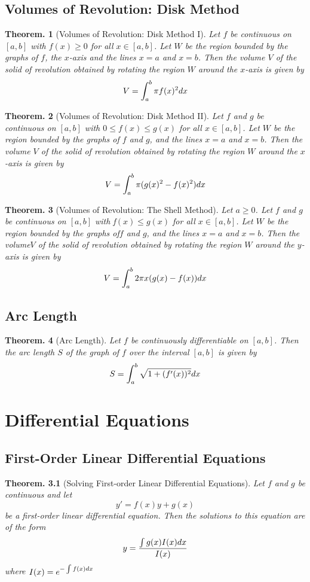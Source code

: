 \documentclass[11pt, a4paper]{memoir}
\theoremstyle{change}
\newtheorem{theorem}{Theorem.}[section]
\theoremstyle{plain}
\theoremstyle{nonumberplain}
\numberwithin{equation}{section}
\begin{document}
\section{Volumes of Revolution: Disk Method}
\begin{theorem}[Volumes of Revolution: Disk Method I]
    Let $f$ be continuous on $[a,b]$ with $f(x) \ge 0$  for all $x \in [a,b]$. Let $W$ be the region bounded by the graphs of $f$, the $x$-axis and the lines $x = a$ and $x = b$. Then the volume $V$ of the solid of revolution obtained by rotating the region $W$ around the $x$-axis is given by $$V = \int^b_a \pi f(x)^2 \space dx$$
\end{theorem}
\begin{theorem}[Volumes of Revolution: Disk Method II]
    Let $f$ and $g$ be continuous on $[a,b]$ with $0 \le f(x) \le g(x)$ for all $x \in [a,b]$. Let $W$ be the region bounded by the graphs of $f$ and $g$, and the lines $x = a$ and $x = b$. Then the volume $V$ of the solid of revolution obtained by rotating the region $W$ around the $x$-axis is given by $$V = \int^b_a \pi(g(x)^2 - f(x)^2)\space dx$$
\end{theorem}
\begin{theorem}[Volumes of Revolution: The Shell Method]
    Let $a \ge 0$. Let $f$ and $g$ be continuous on $ [a,b]$ with f$(x) \le g(x)$ for all $x \in [a, b]$. Let $W$ be the region bounded by the graphs of$ f$ and $g$, and the lines $x = a $ and $x = b$. Then the volume$ V$ of the solid of revolution obtained by rotating the region $W$ around the $y$-axis is given by $$V = \int^b_a 2\pi x(g(x) - f(x)) \space dx$$
\end{theorem}
\section{Arc Length}
\begin{theorem}[Arc Length]
    Let $ f $ be continuously differentiable on $[a, b]$. Then the arc length $S$ of the graph of $f$ over the interval $[a, b]$ is given by $$S = \int^b_a \sqrt{1 + (f'(x))^2} \space dx$$
\end{theorem}

\chapter{Differential Equations}
\section{First-Order Linear Differential Equations}
\begin{theorem}[Solving First-order Linear Differential Equations]
    Let $f$ and $g$  be continuous and let $$y' = f(x)y + g(x)$$ be a first-order linear differential equation. Then the solutions to this equation are of the form $$y = \dfrac{\int g(x)I(x) \space dx}{I(x)}$$ where $I(x) = e^{- \int f(x) \space dx}$
\end{theorem}
\end{document}
